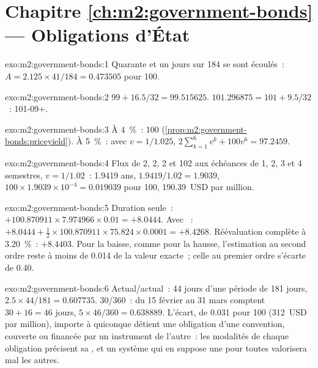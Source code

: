 \section*{Chapitre \ref{ch:m2:government-bonds} --- Obligations d'État}

\begin{solution}{exo:m2:government-bonds:1}
Quarante et un jours sur 184 se sont écoulés~: $A = 2.125 \times 41/184 = 0.473505$ pour
100.
\end{solution}

\begin{solution}{exo:m2:government-bonds:2}
$99 + 16.5/32 = 99.515625$. $101.296875 = 101 + 9.5/32$~: 101-09+.
\end{solution}

\begin{solution}{exo:m2:government-bonds:3}
À 4~\%~: 100 (\cref{prop:m2:government-bonds:priceyield}). À 5~\%~: avec $v =
1/1.025$, $2\sum_{k=1}^{6} v^k + 100 v^6 = 97.2459$.
\end{solution}

\begin{solution}{exo:m2:government-bonds:4}
Flux de 2, 2, 2 et 102 aux échéances de 1, 2, 3 et 4 semestres, $v = 1/1.02$~: 
1.9419 ans,  $1.9419/1.02 = 1.9039$,  $100 \times
1.9039 \times 10^{-4} = 0.019039$ pour 100, 190.39~USD par million.
\end{solution}

\begin{solution}{exo:m2:government-bonds:5}
Duration seule~: $+100.870911 \times 7.974966 \times 0.01 = +8.0444$. Avec
~: $+8.0444 + \frac12 \times 100.870911 \times 75.824 \times 0.0001 =
+8.4268$. Réévaluation complète à 3.20~\%~: $+8.4403$. Pour la baisse, comme pour la hausse,
l'estimation au second ordre reste à moins de 0.014 de la valeur exacte~; celle au premier
ordre s'écarte de 0.40.
\end{solution}

\begin{solution}{exo:m2:government-bonds:6}
Actual/actual~: 44 jours d'une période de 181 jours, $2.5 \times 44/181 = 0.607735$.
30/360~: du 15 février au 31 mars comptent $30 + 16 = 46$ jours, $5 \times 46/360
= 0.638889$. L'écart, de 0.031 pour 100 (312~USD par million), importe à
quiconque détient une obligation d'une convention, couverte ou financée par
un instrument de l'autre~: les modalités de chaque obligation précisent sa , et un
système qui en suppose une pour toutes valorisera mal les autres.
\end{solution}

